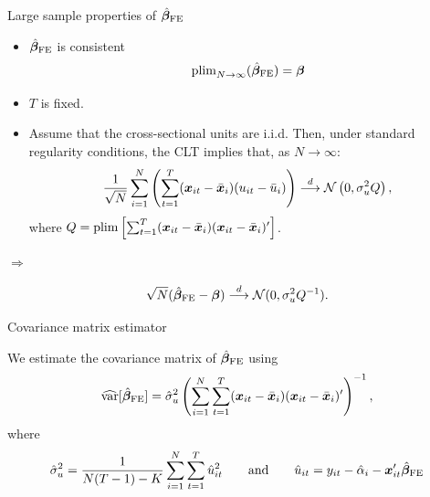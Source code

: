 \documentclass[english, professionalfonts,smaller,xcolor=dvipsnames]{beamer}
\begin{document}
\begin{frame}{Large sample properties of $\hat{\bm \beta}_{\text{FE}}$}

\begin{itemize}
\item $\hat{\bm \beta}_{\text{FE}}$ is consistent
$$
\operatorname{plim}_{N \rightarrow \infty}( \hat{\bm \beta}_{\text{FE}}) = \bm \beta
$$
\vspace*{-\baselineskip}
\item $T$ is fixed.


\item Assume that the cross-sectional units are i.i.d. Then, under standard regularity conditions, the CLT implies that, as $N \rightarrow \infty$:
\[
\frac{1}{\sqrt N}
\sum_{i=1}^N
\left(
\sum_{t=1}^T
(\bm x_{it}-\bar{\bm x}_i ) (u_{it}-\bar{u}_i )\right)
\overset{d}{\longrightarrow}
\mathcal{N} \left(0, \sigma_{u}^{2} Q \right),
\]
where
$
Q = \operatorname{plim} \left[ \sum_{t=1}^T (\bm x_{it}-\bar{\bm x}_i ) (\bm x_{it}-\bar{\bm x}_i )'
\right]$.
\end{itemize}

$\Rightarrow$

\[
\sqrt N(\hat{\bm \beta}_{\text{FE}}-\bm \beta)
\overset{d}{\longrightarrow}
\mathcal{N}(0, \sigma_{u}^{2} Q^{-1}).
\]

\end{frame}

\begin{frame}{Covariance matrix estimator}
    
We estimate the covariance matrix of $\hat{\bm \beta}_{\text{FE}}$ using
$$
\widehat{\operatorname{var}}[\hat{\bm \beta}_{\text{FE}}] = \hat\sigma_u^2 \left( \sum_{i=1}^N \sum_{t=1}^T (\bm x_{it} - \bar{\bm x}_i ) (\bm x_{it} - \bar{\bm x}_i )' \right)^{-1},
$$
where
\[
\hat\sigma_u^2 = \frac{1}{N(T-1)-K} \sum_{i=1}^N \sum_{t=1}^T \hat{u}_{it}^2
\qquad \text{and} \qquad \hat{u}_{it} = y_{it} - \hat\alpha_i - \bm x_{it}' \hat{\bm \beta}_{\text{FE}}
\]

\end{frame}
\end{document}
